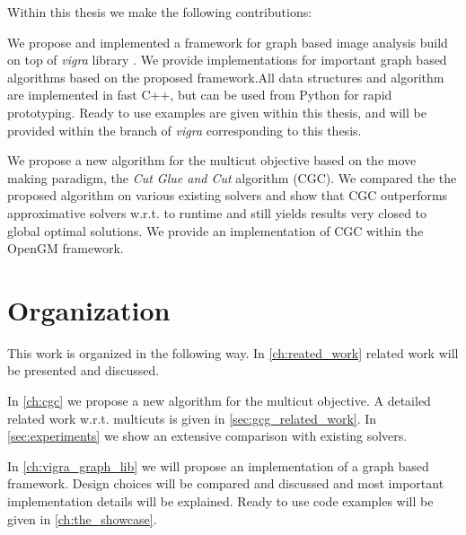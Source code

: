 Within this thesis we make the following contributions:

\begin{compactitem}
    \item We propose and implemented a framework for graph based image analysis 
        build on top of  \emph{vigra} library \cite{koethe_2000_phd_thesis,software_vigra}. We provide implementations for important graph based algorithms based on the proposed framework.All data structures and algorithm are implemented in fast C++, 
        but can be used from Python for rapid prototyping.
        Ready to use examples are given within this thesis, and will be 
        provided within the branch of \emph{vigra} corresponding to 
        this thesis.



    \item 
        We propose a new algorithm for the multicut objective based on the move
        making paradigm, the \emph{Cut Glue and Cut} algorithm (CGC). We compared the 
        the proposed algorithm on various existing solvers and show
        that CGC outperforms approximative solvers w.r.t. to runtime and still yields
        results very closed to global optimal solutions. We provide an implementation of CGC within the OpenGM framework.



\end{compactitem}


\section{Organization}

This work is organized in the following way.
In \cref{ch:reated_work} related work will be presented and  discussed.



In \cref{ch:cgc} we propose a new algorithm for the multicut objective.
A detailed related work w.r.t. multicuts is given in \cref{sec:gcg_related_work}.
In \cref{sec:experiments} we show an extensive comparison  with existing solvers.



In \cref{ch:vigra_graph_lib} we will propose an implementation of
a graph based framework. 
Design choices will be compared and discussed and most 
important implementation details will be explained.
Ready to use code examples will be given in \cref{ch:the_showcase}.




